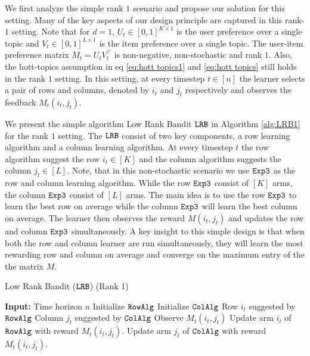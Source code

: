 We first analyze the simple rank $1$ scenario and propose our solution for this setting. Many of the key aspects of our design principle are captured in this rank-$1$ setting. Note that for $d=1$, $U_t\in [0,1]^{K\times 1}$ is the user preference over a single topic and $V_t \in [0,1]^{L\times 1}$ is the item preference over a single topic. The user-item preference matrix $M_t = U_tV_t^{\intercal}$ is non-negative, non-stochastic and rank $1$. Also, the hott-topics assumption in eq \ref{eq:hott topics1} and \ref{eq:hott topics} still holds in the rank $1$ setting. In this setting, at every timestep $t\in[n]$ the learner selects a pair of rows and columns, denoted by $i_t$ and $j_t$ respectively and observes the feedback $M_t(i_t,j_t)$.

We present the simple algorithm Low Rank Bandit ${\tt LRB}$ in Algorithm \ref{alg:LRB1} for the rank $1$ setting. The ${\tt LRB}$ consist of two key components, a row learning algorithm and a column learning algorithm. At every timestep $t$ the row algorithm suggest the row $i_t\in [K]$ and the column algorithm suggests the column $j_t\in [L]$. Note, that in this non-stochastic scenario we use ${\tt Exp3}$ as the row and column learning algorithm. While the row ${\tt Exp3}$ consist of $[K]$ arms, the column ${\tt Exp3}$ consist of $[L]$ arms. The main idea is to use the row ${\tt Exp3}$ to learn the best row on average while the column ${\tt Exp3}$ will learn the best column on average. The learner then observes the reward $M(i_t, j_t)$ and updates the row and column ${\tt Exp3}$ simultaneously. A key insight to this simple design is that when both the row and column learner are run simultaneously, they will learn the most rewarding row and column on average and converge on the maximum entry of the the matrix $M$.

\begin{algorithm}[t]
  \caption{Low Rank Bandit (${\tt LRB}$) (Rank 1)}
  \label{alg:LRB1}
  \begin{algorithmic}[1]
    \State \textbf{Input:} Time horizon $n$
      \State Initialize ${\tt RowAlg} $
      \State Initialize ${\tt ColAlg} $
        \State Row $i_t$ suggested by ${\tt RowAlg}$
        \State Column $j_t$ suggested by ${\tt ColAlg}$
        \State Observe $M_t(i_t, j_t)$
    \State Update arm $i_t$ of ${\tt RowAlg}$ with reward $M_t(i_t, j_t)$.
    \State Update arm $j_t$ of ${\tt ColAlg}$ with reward $M_t(i_t, j_t)$.
     \EndFor
  \end{algorithmic}
\end{algorithm}